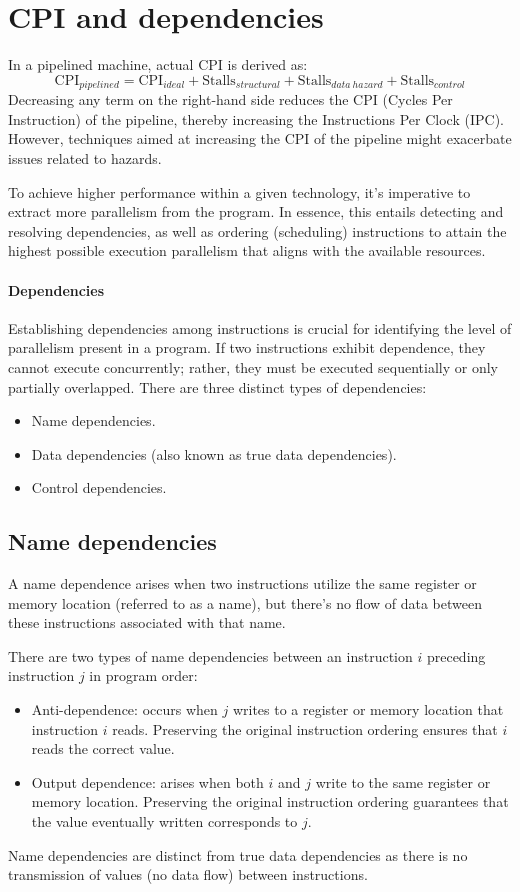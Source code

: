 \section{CPI and dependencies}
In a pipelined machine, actual CPI is derived as:
\[\text{CPI}_{pipelined} = \text{CPI}_{ideal} + \text{Stalls}_{structural} + \text{Stalls}_{data\:hazard} + \text{Stalls}_{control}\]
Decreasing any term on the right-hand side reduces the CPI (Cycles Per Instruction) of the pipeline, thereby increasing the Instructions Per Clock (IPC).
However, techniques aimed at increasing the CPI of the pipeline might exacerbate issues related to hazards.

To achieve higher performance within a given technology, it's imperative to extract more parallelism from the program.
In essence, this entails detecting and resolving dependencies, as well as ordering (scheduling) instructions to attain the highest possible execution parallelism that aligns with the available resources.

\paragraph*{Dependencies}
Establishing dependencies among instructions is crucial for identifying the level of parallelism present in a program.
If two instructions exhibit dependence, they cannot execute concurrently; rather, they must be executed sequentially or only partially overlapped.
There are three distinct types of dependencies:
\begin{itemize}
    \item Name dependencies.
    \item Data dependencies (also known as true data dependencies).
    \item Control dependencies.
\end{itemize}

\subsection{Name dependencies}
A name dependence arises when two instructions utilize the same register or memory location (referred to as a name), but there's no flow of data between these instructions associated with that name.

There are two types of name dependencies between an instruction $i$ preceding instruction $j$ in program order:
\begin{itemize}
    \item Anti-dependence: occurs when $j$ writes to a register or memory location that instruction $i$ reads. 
        Preserving the original instruction ordering ensures that $i$ reads the correct value.
    \item Output dependence: arises when both $i$ and $j$ write to the same register or memory location. 
        Preserving the original instruction ordering guarantees that the value eventually written corresponds to $j$.
\end{itemize}
Name dependencies are distinct from true data dependencies as there is no transmission of values (no data flow) between instructions.

